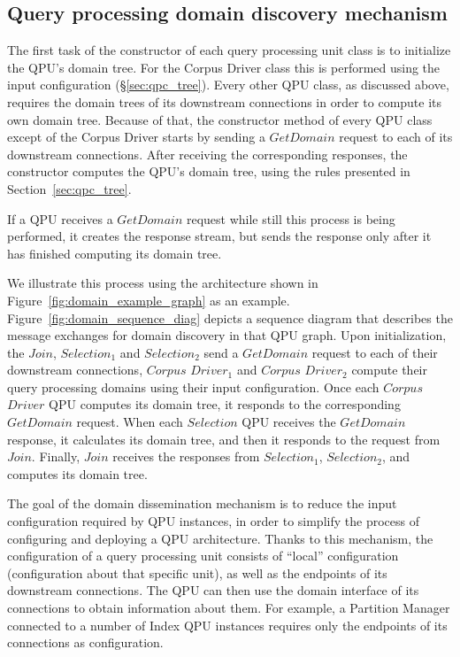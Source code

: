 \subsection{Query processing domain discovery mechanism}

The first task of the constructor of each query processing unit class is to initialize the QPU's domain tree.
For the Corpus Driver class this is performed using the input configuration (\S\ref{sec:qpc_tree}).
Every other QPU class, as discussed above, requires the domain trees of its downstream connections in order to compute its own domain tree.
Because of that, the constructor method of every QPU class except of the Corpus Driver starts by sending a $GetDomain$ request to each
of its downstream connections.
After receiving the corresponding responses, the constructor computes the QPU's domain tree, using the rules presented in Section~\ref{sec:qpc_tree}.

If a QPU receives a $GetDomain$ request while still this process is being performed, it creates the response stream,
but sends the response only after it has finished computing its domain tree.

We illustrate this process using the architecture shown in Figure~\ref{fig:domain_example_graph} as an example.
Figure~\ref{fig:domain_sequence_diag} depicts a sequence diagram that describes the message exchanges for domain discovery
in that QPU graph.
Upon initialization, the $Join$, $Selection_1$ and $Selection_2$ send a $GetDomain$ request to each of their downstream
connections,
$Corpus$ $Driver_1$ and $Corpus$ $Driver_2$ compute their query processing domains using their input configuration.
Once each $Corpus$ $Driver$ QPU computes its domain tree, it responds to the corresponding $GetDomain$ request.
When each $Selection$ QPU receives the $GetDomain$ response, it calculates its domain tree, and then it responds to the request from $Join$.
Finally, $Join$ receives the responses from $Selection_1$, $Selection_2$, and computes its domain tree.

\medskip
\noindent
The goal of the domain dissemination mechanism is to reduce the input configuration required by QPU instances,
in order to simplify the process of configuring and deploying a QPU architecture.
Thanks to this mechanism, the configuration of a query processing unit consists of ``local'' configuration
(configuration about that specific unit), as well as the endpoints of its downstream connections.
The QPU can then use the domain interface of its connections to obtain information about them.
For example, a Partition Manager connected to a number of Index QPU instances requires only the endpoints of its
connections as configuration.


